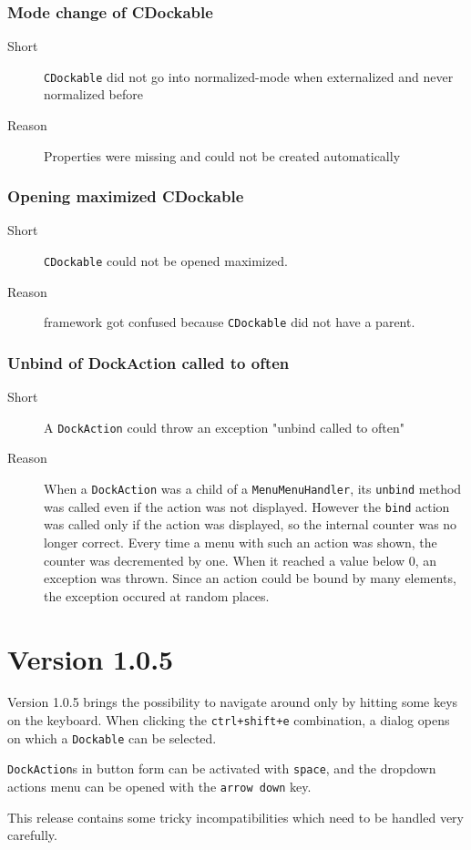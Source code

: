 \documentclass[a4paper,10pt]{article}
\newcommand{\src}[1]{\lstinline[basicstyle=\normalsize\ttfamily,keywordstyle=\normalsize\ttfamily,identifierstyle=\normalsize\ttfamily]|#1|}
\newcommand{\short}{\item[Short]}
\newcommand{\why}{\item[Reason]}
\begin{document}
\subsubsection{Mode change of CDockable}
\begin{description}
 \short \src{CDockable} did not go into normalized-mode when externalized and never normalized before
 \why Properties were missing and could not be created automatically
\end{description}

\subsubsection{Opening maximized CDockable}
\begin{description}
 \short \src{CDockable} could not be opened maximized.
 \why framework got confused because \src{CDockable} did not have a parent.
\end{description}

\subsubsection{Unbind of DockAction called to often}
\begin{description}
 \short A \src{DockAction} could throw an exception "unbind called to often"
 \why When a \src{DockAction} was a child of a \src{MenuMenuHandler}, its \src{unbind} method was called even if the action was not displayed. However the \src{bind} action was called only if the action was displayed, so the internal counter was no longer correct. Every time a menu with such an action was shown, the counter was decremented by one. When it reached a value below 0, an exception was thrown. Since an action could be bound by many elements, the exception occured at random places.
\end{description}

\section{Version 1.0.5}
Version 1.0.5 brings the possibility to navigate around only by hitting some keys on the keyboard. When clicking the \src{ctrl+shift+e} combination, a dialog opens on which a \src{Dockable} can be selected.

\src{DockAction}s in button form can be activated with \src{space}, and the dropdown actions menu can be opened with the \src{arrow down} key.

This release contains some tricky incompatibilities which need to be handled very carefully.
\end{document}
